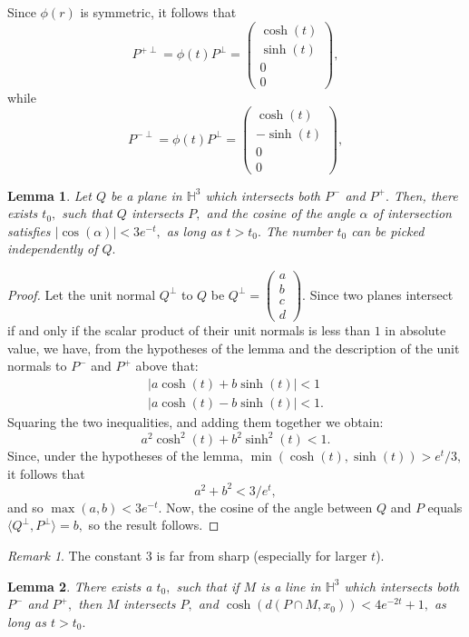 \documentclass[12pt]{amsart}
\newtheorem{lemma}{Lemma}
\theoremstyle{remark}
\newtheorem{remark}[theorem]{Remark}
\begin{document}
Since $\phi(r)$ is symmetric, it follows that \[P^{+\perp} = \phi(t) P^\perp = \begin{pmatrix} \cosh(t) \\ \sinh(t) \\ 0 \\0\end{pmatrix},\] while 
\[P^{-\perp} = \phi(t) P^\perp = \begin{pmatrix} \cosh(t) \\ -\sinh(t) \\ 0 \\0\end{pmatrix},\]
\begin{lemma}
\label{anglemma}
 Let $Q$ be a plane in $\mathbb{H}^3$ which intersects both $P^-$ and $P^+.$ Then, there exists $t_0,$ such that $Q$ intersects $P,$ and the cosine of the  angle $\alpha$ of intersection satisfies $|\cos(\alpha)| <3 e^{-t},$ as long as $t > t_0.$ The number $t_0$ can be picked \emph{independently} of $Q.$
\end{lemma}
 
\begin{proof}
Let the unit normal $Q^\perp$ to $Q$ be $Q^\perp=\begin{pmatrix}a\\b\\c\\d\end{pmatrix}.$  
Since two planes intersect if and only if the scalar product of their unit normals is less than $1$ in absolute value, we have, from the hypotheses of the lemma and the description of the unit normals to $P^-$ and $P^+$ above that:
\begin{gather}
|a \cosh(t) + b \sinh(t)| < 1 \\
|a \cosh(t) - b \sinh(t)| < 1.
\end{gather}
Squaring the two inequalities, and adding them together we obtain:
\[
a^2 \cosh^2(t) + b^2 \sinh^2(t) < 1.
\]
Since, under the hypotheses of the lemma, $\min(\cosh(t), \sinh(t)) > e^t/3,$ it follows that
\[
a^2 + b^2 < 3/e^t,
\]
and so $\max(a, b) < 3e^{-t}.$
Now, the cosine of the angle between $Q$ and $P$ equals $\langle Q^\perp, P^\perp\rangle = b,$ so the result follows.
\end{proof}

\begin{remark}
The constant $3$ is far from sharp (especially for larger $t$).
\end{remark}

\begin{lemma} 
\label{distlem}
There exists a $t_0,$ such that if  $M$ is a line in $\mathbb{H}^3$ which intersects both $P^-$ and $P^+,$ then $M$ intersects $P,$ and $\cosh(d(P\cap M, x_0)) < 4 e^{-2t}+1, $ as long as $t > t_0.$
\end{lemma}
\end{document}
